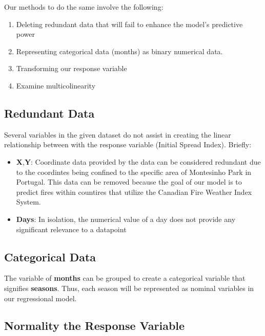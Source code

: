 \documentclass[conference,final,]{IEEEtran}
\begin{document}
Our methods to do the same involve the following:

\begin{enumerate}
\def\labelenumi{\arabic{enumi}.}
\item
  Deleting redundant data that will fail to enhance the model's
  predictive power 
\item
  Representing categorical data (months) as binary numerical data. 
\item
  Transforming our response variable 
\item
  Examine multicolinearity 
\end{enumerate}

\hypertarget{redundant-data}{%
\subsection{Redundant Data}\label{redundant-data}}

Several variables in the given dataset do not assist in creating the
linear relationship between with the response variable (Initial Spread
Index). Briefly:

\begin{itemize}
\item
  \textbf{X},\textbf{Y}: Coordinate data provided by the data can be
  considered redundant due to the coordintes being confined to the
  specific area of Montesinho Park in Portugal. This data can be removed
  because the goal of our model is to predict fires within countires
  that utilize the Canadian Fire Weather Index System.
\item
  \textbf{Days}: In isolation, the numerical value of a day does not
  provide any significant relevance to a datapoint 
\end{itemize}

\hypertarget{categorical-data}{%
\subsection{Categorical Data}\label{categorical-data}}

The variable of \textbf{months} can be grouped to create a categorical
variable that signifies \textbf{seasons}. Thus, each season will be
represented as nominal variables in our regressional model.

\hypertarget{normality-the-response-variable}{%
\subsection{Normality the Response
Variable}\label{normality-the-response-variable}}
\end{document}
